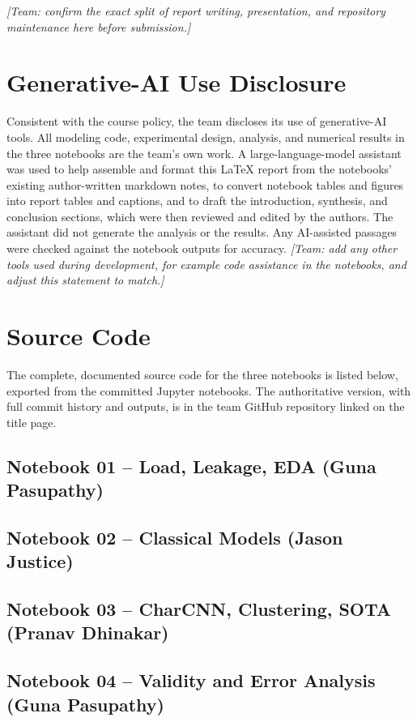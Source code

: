 \documentclass[stu,12pt,floatsintext]{apa7}
\begin{document}
\emph{[Team: confirm the exact split of report writing, presentation, and
repository maintenance here before submission.]}

\section{Generative-AI Use Disclosure}

Consistent with the course policy, the team discloses its use of
generative-AI tools. All modeling code, experimental design, analysis, and
numerical results in the three notebooks are the team's own work. A
large-language-model assistant was used to help assemble and format this
LaTeX report from the notebooks' existing author-written markdown notes,
to convert notebook tables and figures into report tables and captions,
and to draft the introduction, synthesis, and conclusion sections, which
were then reviewed and edited by the authors. The assistant did not
generate the analysis or the results. Any AI-assisted passages were
checked against the notebook outputs for accuracy. \emph{[Team: add any
other tools used during development, for example code assistance in the
notebooks, and adjust this statement to match.]}

\section{Source Code}

The complete, documented source code for the three notebooks is listed
below, exported from the committed Jupyter notebooks. The authoritative
version, with full commit history and outputs, is in the team GitHub
repository linked on the title page.

\singlespacing

\subsection{Notebook 01 -- Load, Leakage, EDA (Guna Pasupathy)}


\subsection{Notebook 02 -- Classical Models (Jason Justice)}


\subsection{Notebook 03 -- CharCNN, Clustering, SOTA (Pranav Dhinakar)}


\subsection{Notebook 04 -- Validity and Error Analysis (Guna Pasupathy)}

\end{document}
